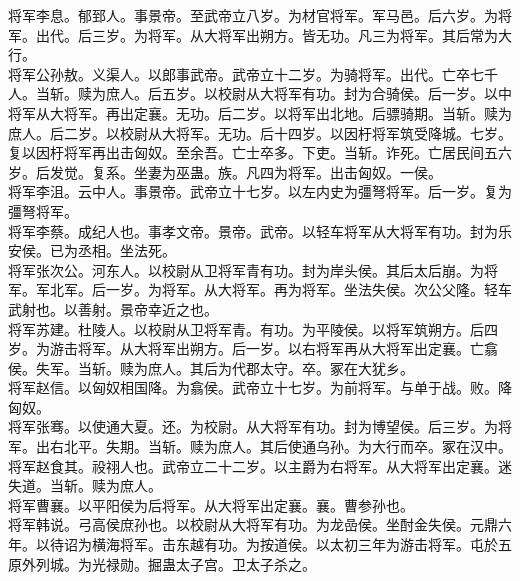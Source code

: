 \documentclass{zhvt-classic}
\begin{document}
\hspace*{2em}将军李息。郁郅人。事景帝。至武帝立八岁。为材官将军。军马邑。后六岁。为将军。出代。后三岁。为将军。从大将军出朔方。皆无功。凡三为将军。其后常为大行。\\
\hspace*{2em}将军公孙敖。义渠人。以郎事武帝。武帝立十二岁。为骑将军。出代。亡卒七千人。当斩。赎为庶人。后五岁。以校尉从大将军有功。封为合骑侯。后一岁。以中将军从大将军。再出定襄。无功。后二岁。以将军出北地。后骠骑期。当斩。赎为庶人。后二岁。以校尉从大将军。无功。后十四岁。以因杅将军筑受降城。七岁。复以因杅将军再出击匈奴。至余吾。亡士卒多。下吏。当斩。诈死。亡居民间五六岁。后发觉。复系。坐妻为巫蛊。族。凡四为将军。出击匈奴。一侯。\\
\hspace*{2em}将军李沮。云中人。事景帝。武帝立十七岁。以左内史为彊弩将军。后一岁。复为彊弩将军。\\
\hspace*{2em}将军李蔡。成纪人也。事孝文帝。景帝。武帝。以轻车将军从大将军有功。封为乐安侯。已为丞相。坐法死。\\
\hspace*{2em}将军张次公。河东人。以校尉从卫将军青有功。封为岸头侯。其后太后崩。为将军。军北军。后一岁。为将军。从大将军。再为将军。坐法失侯。次公父隆。轻车武射也。以善射。景帝幸近之也。\\
\hspace*{2em}将军苏建。杜陵人。以校尉从卫将军青。有功。为平陵侯。以将军筑朔方。后四岁。为游击将军。从大将军出朔方。后一岁。以右将军再从大将军出定襄。亡翕侯。失军。当斩。赎为庶人。其后为代郡太守。卒。冢在大犹乡。\\
\hspace*{2em}将军赵信。以匈奴相国降。为翕侯。武帝立十七岁。为前将军。与单于战。败。降匈奴。\\
\hspace*{2em}将军张骞。以使通大夏。还。为校尉。从大将军有功。封为博望侯。后三岁。为将军。出右北平。失期。当斩。赎为庶人。其后使通乌孙。为大行而卒。冢在汉中。\\
\hspace*{2em}将军赵食其。祋祤人也。武帝立二十二岁。以主爵为右将军。从大将军出定襄。迷失道。当斩。赎为庶人。\\
\hspace*{2em}将军曹襄。以平阳侯为后将军。从大将军出定襄。襄。曹参孙也。\\
\hspace*{2em}将军韩说。弓高侯庶孙也。以校尉从大将军有功。为龙嵒侯。坐酎金失侯。元鼎六年。以待诏为横海将军。击东越有功。为按道侯。以太初三年为游击将军。屯於五原外列城。为光禄勋。掘蛊太子宫。卫太子杀之。\\
\end{document}

